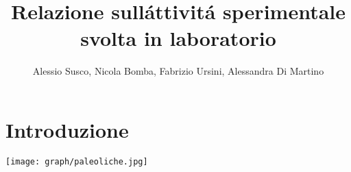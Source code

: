 \documentclass[a4paper,13pt]{article}
\begin{document}
\author{Alessio Susco, Nicola Bomba, Fabrizio Ursini, Alessandra Di Martino}

\title{Relazione sull\' attivit\'a sperimentale svolta in laboratorio}

\maketitle
\section{Introduzione}
\begin{center}
\texttt{[image: graph/paleoliche.jpg]}
\end{center}
\end{document}
